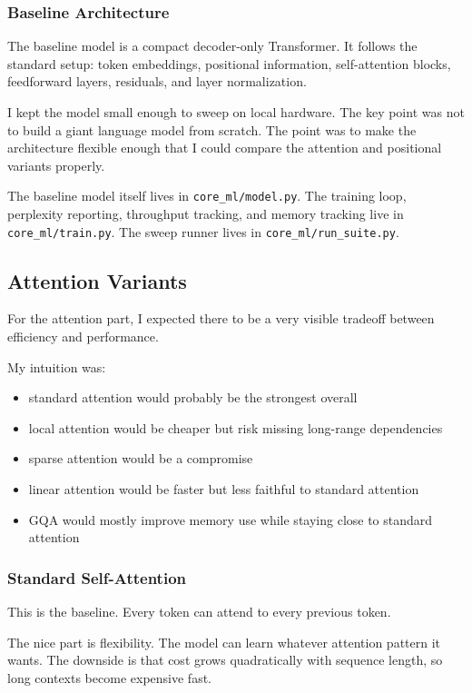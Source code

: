 \documentclass[11pt]{article}
\begin{document}
\subsubsection{Baseline Architecture}
The baseline model is a compact decoder-only Transformer. It follows the standard setup: token embeddings, positional information, self-attention blocks, feedforward layers, residuals, and layer normalization.

I kept the model small enough to sweep on local hardware. The key point was not to build a giant language model from scratch. The point was to make the architecture flexible enough that I could compare the attention and positional variants properly.

The baseline model itself lives in \texttt{core\_ml/model.py}. The training loop, perplexity reporting, throughput tracking, and memory tracking live in \texttt{core\_ml/train.py}. The sweep runner lives in \texttt{core\_ml/run\_suite.py}.

\subsection{Attention Variants}
For the attention part, I expected there to be a very visible tradeoff between efficiency and performance.

My intuition was:
\begin{itemize}[leftmargin=*]
  \item standard attention would probably be the strongest overall
  \item local attention would be cheaper but risk missing long-range dependencies
  \item sparse attention would be a compromise
  \item linear attention would be faster but less faithful to standard attention
  \item GQA would mostly improve memory use while staying close to standard attention
\end{itemize}

\subsubsection{Standard Self-Attention}
This is the baseline. Every token can attend to every previous token.

The nice part is flexibility. The model can learn whatever attention pattern it wants. The downside is that cost grows quadratically with sequence length, so long contexts become expensive fast.
\end{document}
